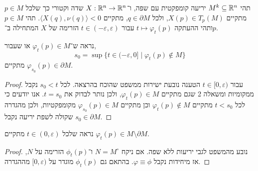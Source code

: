 \question{}
תהי $M^k \subseteq \mathbb{R}^n$ יריעה קומפקטית עם שפה, ו־$X : \mathbb{R}^n \to \mathbb{R}^n$ שדה וקטורי כך שלכל $p \in M$ מתקיים $X(p) \in T_p(M)$,
ולכל $q \in \partial M$, מתקיים $\langle X(q), \nu(q) \rangle < 0$.
תהי $p \in M$ ותהי ההעתקה $t \mapsto \varphi_t(p)$ עבור $t \in (-\varepsilon, \varepsilon)$ הזרימה של $X$ המתחילה ב־$p$.

\subquestion{}
נראה ש־$\varphi_t(p) \in M$ או שעבור,
\[
	s_0
	= \sup\{ t \in (-\varepsilon, 0] \mid \varphi_t(p) \notin M \}
\]
מתקיים $\varphi_{s_0}(p) \in \partial M$.
\begin{proof}
	עבור $t \in [0, \varepsilon)$ הטענה נובעת ישירות ממשפט שהוכח בהרצאה.
	לכל $s_0 < t$ נקבל ממקומיות ומשאלה 2 שגם מתקיים $\varphi_t(p) \in M$, ולכן נותר לבדוק את $t = s_0$.
	אנו יודעים כי לכל $t < s_0$ מתקיים $\varphi_t(p) \notin M$ וכן מתקיים $\varphi_{s_0}(p) \in M$ מקומפקטיות, ולכן מהגדרה שקולה לשפת יריעה נקבל $s_0 \in \partial M$.
\end{proof}

\subquestion{}
נראה שלכל $t \in (0, \varepsilon)$ מתקיים $\varphi_t(p) \in M \setminus \partial M$.
\begin{proof}
	נובע מהמשפט לגבי יריעות ללא שפה.
	אם ניקח $N = M^\circ$ ו־$\phi_t(p)$ הזרימה על $N$, אז מיחידות נקבל $\varphi \equiv \phi$.
	בהתאם גם $\phi_t(p)$ מוגדר על $[0, \varepsilon)$ מההגדרה.
\end{proof}


